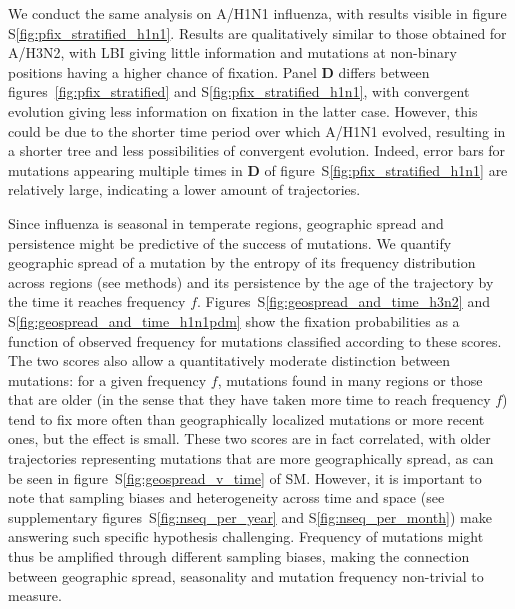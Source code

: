 \documentclass[reprint,amsmath,amssymb,superscriptaddress,showpacs,pre]{revtex4-1}
\newcommand{\sref}[1]{S\ref{#1}}
\begin{document}
We conduct the same analysis on A/H1N1 influenza, with results visible in figure \sref{fig:pfix_stratified_h1n1}. 
Results are qualitatively similar to those obtained for A/H3N2, with LBI giving little information and mutations at non-binary positions having a higher chance of fixation. 
Panel \textbf{D} differs between figures~\ref{fig:pfix_stratified} and \sref{fig:pfix_stratified_h1n1}, with convergent evolution giving less information on fixation in the latter case. 
However, this could be due to the shorter time period over which A/H1N1 evolved, resulting in a shorter tree and less possibilities of convergent evolution. 
Indeed, error bars for mutations appearing multiple times in \textbf{D} of figure~\sref{fig:pfix_stratified_h1n1} are relatively large, indicating a lower amount of trajectories.

Since influenza is seasonal in temperate regions, geographic spread and persistence might be predictive of the success of mutations. 
We quantify geographic spread of a mutation by the entropy of its frequency distribution across regions (see methods) and its persistence by the age of the trajectory by the time it reaches frequency $f$. 
Figures~\sref{fig:geospread_and_time_h3n2} and \sref{fig:geospread_and_time_h1n1pdm} show the fixation probabilities as a function of observed frequency for mutations classified according to these scores. 
The two scores also allow a quantitatively moderate distinction between mutations: for a given frequency $f$, mutations found in many regions or those that are older (in the sense that they have taken more time to reach frequency $f$) tend to fix more often than geographically localized mutations or more recent ones, but the effect is small.
These two scores are in fact correlated, with older trajectories representing mutations that are more geographically spread, as can be seen in figure~\sref{fig:geospread_v_time} of SM.
However, it is important to note that sampling biases and heterogeneity across time and space (see supplementary figures~\sref{fig:nseq_per_year} and \sref{fig:nseq_per_month}) make answering such specific hypothesis challenging.
Frequency of mutations might thus be amplified through different sampling biases, making the connection between geographic spread, seasonality and mutation frequency non-trivial to measure. 
\end{document}
